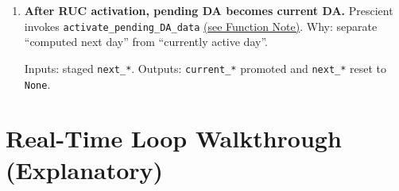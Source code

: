 \documentclass{article}
\begin{document}
\begin{enumerate}[leftmargin=*]
  Inputs: DA result object. Outputs: forecaster-internal historical updates (implementation dependent).

  \item \textbf{After RUC activation, pending DA becomes current DA.} Prescient invokes \texttt{activate\_pending\_DA\_data} \hyperref[fn:activate_pending_DA_data]{(see Function Note)}. Why: separate ``computed next day'' from ``currently active day''.

  Inputs: staged \texttt{next\_*}. Outputs: \texttt{current\_*} promoted and \texttt{next\_*} reset to \texttt{None}.
\end{enumerate}

\section{Real-Time Loop Walkthrough (Explanatory)}
\end{document}
